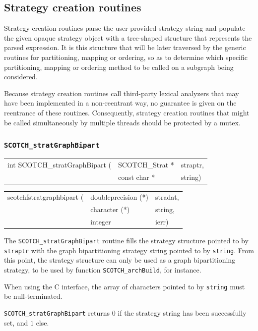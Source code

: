 \subsection{Strategy creation routines}
\label{sec-lib-strat-creation}

Strategy creation routines parse the user-provided strategy string and
populate the given opaque strategy object with a tree-shaped structure
that represents the parsed expression. It is this structure that will
be later traversed by the generic routines for partitioning, mapping or
ordering, so as to determine which specific partitioning, mapping or
ordering method to be called on a subgraph being considered.

Because strategy creation routines call third-party lexical analyzers
that may have been implemented in a non-reentrant way, no guarantee is
given on the reentrance of these routines. Consequently, strategy
creation routines that might be called simultaneously by multiple
threads should be protected by a mutex.

\subsubsection{{\tt SCOTCH\_stratGraphBipart}}
\label{sec-lib-strat-graph-bipart}

\begin{itemize}
\progsyn

{\tt\begin{tabular}{l@{}ll}
int SCOTCH\_stratGraphBipart ( & SCOTCH\_Strat * & straptr, \\
                               & const char *    & string)
\end{tabular}}

{\tt\begin{tabular}{l@{}ll}
scotchfstratgraphbipart ( & doubleprecision (*) & stradat, \\
                          & character (*)       & string,  \\
                          & integer             & ierr)
\end{tabular}}

\progdes

The {\tt SCOTCH\_stratGraphBipart} routine fills the strategy structure
pointed to by {\tt straptr} with the graph bipartitioning strategy
string pointed to by {\tt string}. From this point, the strategy
structure can only be used as a graph bipartitioning strategy, to be
used by function {\tt SCOTCH\_\lbt arch\lbt Build}, for instance.

When using the C interface, the array of characters pointed to by
{\tt string} must be null-terminated.

\progret

{\tt SCOTCH\_stratGraphBipart} returns $0$ if the strategy string has
been successfully set, and $1$ else.
\end{itemize}

